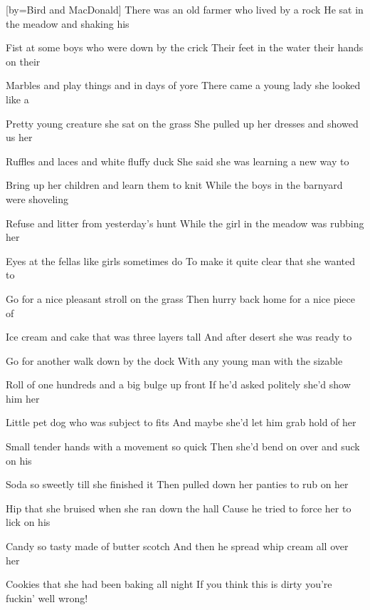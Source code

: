 [by={Bird and MacDonald}]
\beginverse
There was an old farmer who lived by a rock
He sat in the meadow and shaking his
\endverse

\beginverse
Fist at some boys who were down by the crick 
Their feet in the water their hands on their
\endverse

\beginverse
Marbles and play things and in days of yore 
There came a young lady she looked like a
\endverse
 
\beginverse
Pretty young creature she sat on the grass 
She pulled up her dresses and showed us her
\endverse

\beginverse
Ruffles and laces and white fluffy duck 
She said she was learning a new way to
\endverse

\beginverse
Bring up her children and learn them to knit 
While the boys in the barnyard were shoveling
\endverse
 
\beginverse
Refuse and litter from yesterday's hunt 
While the girl in the meadow was rubbing her
\endverse

\beginverse
Eyes at the fellas like girls sometimes do
To make it quite clear that she wanted to
\endverse

\beginverse
Go for a nice pleasant stroll on the grass 
Then hurry back home for a nice piece of
\endverse
 
\beginverse
Ice cream and cake that was three layers tall 
And after desert she was ready to 
\endverse
 
\beginverse
Go for another walk down by the dock 
With any young man with the sizable
\endverse

\beginverse
Roll of one hundreds and a big bulge up front 
If he'd asked politely she'd show him her
\endverse

\beginverse
Little pet dog who was subject to fits 
And maybe she'd let him grab hold of her
\endverse

\beginverse
Small tender hands with a movement so quick 
Then she'd bend on over and suck on his
\endverse

\beginverse
Soda so sweetly till she finished it 
Then pulled down her panties to rub on her
\endverse

\beginverse
Hip that she bruised when she ran down the hall 
Cause he tried to force her to lick on his
\endverse

\beginverse
Candy so tasty made of butter scotch 
And then he spread whip cream all over her
\endverse

\beginverse
Cookies that she had been baking all night
If you think this is dirty you're fuckin' well wrong!
\endverse
\endsong
